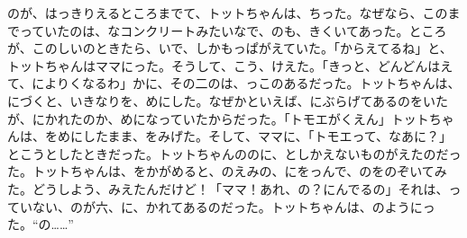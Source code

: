 のが、はっきりえるところまでて、トットちゃんは、ちった。なぜなら、このまでっていたのは、なコンクリートみたいなで、のも、きくいてあった。ところが、このしいのときたら、いで、しかもっぱがえていた。「からえてるね」と、トットちゃんはママにった。そうして、こう、けえた。「きっと、どんどんはえて、によりくなるわ」かに、その二のは、っこのあるだった。トットちゃんは、にづくと、いきなりを、めにした。なぜかといえば、にぶらげてあるのをいたが、にかれたのか、めになっていたからだった。「トモエがくえん」トットちゃんは、をめにしたまま、をみげた。そして、ママに、「トモエって、なあに？」とこうとしたときだった。トットちゃんののに、としかえないものがえたのだった。トットちゃんは、をかがめると、のえみの、にをっんで、のをのぞいてみた。どうしよう、みえたんだけど！「ママ！あれ、の？にんでるの」それは、っていない、のが六、に、かれてあるのだった。トットちゃんは、のようにった。“の……”

